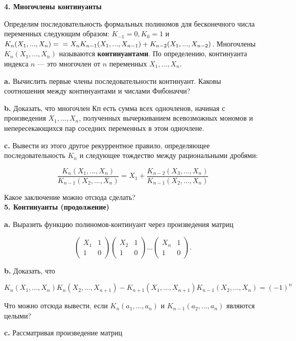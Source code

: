 \documentclass{mai_book}
\begin{document}
\noindent \textbf{4. Многочлены континуанты}

Определим последовательность формальных полиномов для 
бесконечного числа переменных следующим образом: $K_{-1} = 0, K_0 = 1$ и
$K_n(X_1,...,X_n)= \\ =X_nK_{n-1}(X_1,...,X_{n-1})+K_{n-2}(X_1,...,X_{n-2})$. Многочлены $K_n(X_1,...,X_n)$ называются \textbf{континуантами}. По определению, континуанта индекса $n$ — это многочлен от $n$ переменных $X_1,...,X_n$.

\textbf{a.} Вычислить первые члены последовательности континуант. Каковы соотношения между континуантами и числами Фибоначчи?

\textbf{b.} Доказать, что многочлен Кп есть сумма всех одночленов, 
начиная с произведения $X_1,...,X_n$, полученных вычеркиванием 
всевозможных мономов и непересекающихся пар соседних переменных в этом 
одночлене.

\textbf{c.} Вывести из этого другое рекуррентное правило, определяющее
последовательность $K_n$ и следующее тождество между рациональными
дробями:

\[
\frac{K_n(X_1,...,X_n)}{K_{n-1}(X_2,...,X_n)} = X_1+\frac{K_{n-2}(X_3,...,X_n)}{K_{n-1}(X_2,...,X_n)}
\]

\noindent Какое заключение можно отсюда сделать?
\\

\noindent \textbf{5. Континуанты (продолжение)}

\textbf{a.} Выразить функцию полиномов-континуант через произведения
матриц

\[
\begin{pmatrix}
X_1 & 1\\
1 & 0
\end{pmatrix} \begin{pmatrix}
X_2 & 1\\
1 & 0
\end{pmatrix} ... \begin{pmatrix}
X_n & 1\\
1 & 0
\end{pmatrix}.
\]

\textbf{b.} Доказать, что

\[
K_n(X_1,...,X_n)K_n(X_2,...,X_{n+1})-K_{n+1}(X_1,...,X_{n+1})K_{n-1}(X_2,...,X_n) = (-1)^n
\]

Что можно отсюда вывести, если $K_n(a_1,...,a_n)$ и $K_{n-1}(a_2,...,a_n)$ являются целыми?

\textbf{c.} Рассматривая произведение матриц
\end{document}
